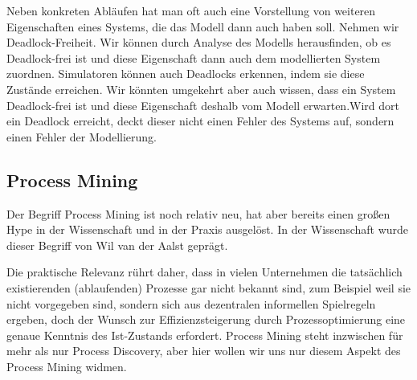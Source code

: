 Neben konkreten Abläufen hat man oft auch eine Vorstellung von weiteren Eigenschaften eines Systems, die das Modell dann auch haben soll. Nehmen wir Deadlock-Freiheit. Wir können durch Analyse des Modells herausfinden, ob es Deadlock-frei ist und diese Eigenschaft dann auch dem modellierten System zuordnen. Simulatoren können auch Deadlocks erkennen, indem sie diese Zustände erreichen. Wir könnten umgekehrt aber auch wissen, dass ein System Deadlock-frei ist und diese Eigenschaft deshalb vom Modell erwarten.Wird dort ein Deadlock erreicht, deckt dieser nicht einen Fehler des Systems auf, sondern einen Fehler der Modellierung. 

\clearpage %

\subsection*{Process Mining}
\label{text:process_mining}

Der Begriff Process Mining ist noch relativ neu, hat aber bereits einen großen Hype in der Wissenschaft und in der Praxis ausgelöst. 
In der Wissenschaft wurde dieser Begriff von Wil van der Aalst geprägt.

\vspace{\baselineskip} %


\vspace{\baselineskip} %
	
Die praktische Relevanz rührt daher, dass in vielen Unternehmen die tatsächlich existierenden (ablaufenden) Prozesse gar nicht bekannt sind, zum Beispiel weil sie nicht vorgegeben sind, sondern sich aus dezentralen informellen Spielregeln ergeben, doch der Wunsch zur Effizienzsteigerung durch Prozessoptimierung eine genaue Kenntnis des Ist-Zustands erfordert. Process Mining steht inzwischen für mehr als nur Process Discovery, aber hier wollen wir uns nur diesem Aspekt des Process Mining widmen. 

